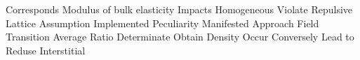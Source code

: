 \documentclass{article}
\begin{document}
\printnoidxglossary[sort=standard,style=listhypergroup]






\clearpage
\gls{Corresponds}
\gls{Modulus of bulk elasticity}
\gls{Impacts}
\gls{Homogeneous}
\gls{Violate}
\gls{Repulsive}
\gls{Lattice}
\gls{Assumption}
\gls{Implemented}
\gls{Peculiarity}
\gls{Manifested}
\gls{Approach}
\gls{Field}
\gls{Transition}
\gls{Average}
\gls{Ratio}
\gls{Determinate}
\gls{Obtain}
\gls{Density}
\gls{Occur}
\gls{Conversely}
\gls{Lead to}
\gls{Reduse}
\gls{Interstitial}

\end{document}

